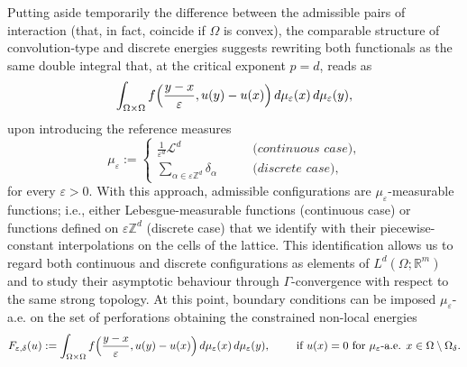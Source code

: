 \documentclass{article}
\theoremstyle{plain}
\theoremstyle{definition}
\def\e{\varepsilon}
\def\ZZ{{\mathbb Z}}
\numberwithin{equation}{section}
\begin{document}
Putting aside temporarily the difference between the admissible pairs of interaction (that, in fact, coincide if $\Omega$ is convex), the comparable structure of convolution-type and discrete energies suggests rewriting both functionals as the same double integral that, at the critical exponent $p=d$, reads as
\begin{equation*}
\int_{\Omega\times\Omega}f\Bigl(\frac{y-x}{\e}, u(y)-u(x)\Bigr)\, d\mu_\e(x)\, d\mu_\e(y),
\end{equation*}
upon introducing the reference measures
\begin{equation*}
    \mu_\e:=\begin{cases}
        \displaystyle\frac{1}{\e^d}\mathcal{L}^d & \qquad  \textit{(continuous case),} \\[7pt]
        \displaystyle\sum_{\alpha\in \e\ZZ^d}\delta_\alpha & \qquad \textit{(discrete case),}
    \end{cases}
\end{equation*}
for every $\e>0$. With this approach, admissible configurations are $\mu_\e$-measurable functions; i.e., either Lebesgue-measurable functions (continuous case) or functions defined on $\e\mathbb Z^d$ (discrete case) that we identify with their piecewise-constant interpolations on the cells of the lattice. This identification allows us to regard both continuous and discrete configurations as elements of $L^d(\Omega;\mathbb R^m)$ and to study their asymptotic behaviour through $\Gamma$-convergence with respect to the same strong topology. At this point, boundary conditions can be imposed $\mu_\e$-a.e. on the set of perforations obtaining the constrained non-local energies 
\begin{equation}\label{energieintro}
F_{\e,\delta}(u):=\int_{\Omega\times\Omega}f\Bigl(\frac{y-x}{\e}, u(y)-u(x)\Bigr)\, d\mu_\e(x)\, d\mu_\e(y),\qquad \text{ if } u(x)=0 \text{ for } \mu_\e\text{-a.e. }x \in \Omega\setminus\Omega_\delta.
\end{equation}
\end{document}
